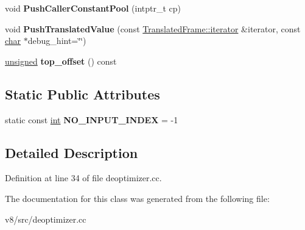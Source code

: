 \begin{DoxyCompactItemize}
void {\bfseries Push\+Caller\+Constant\+Pool} (intptr\+\_\+t cp)
\item 
\mbox{\label{classv8_1_1internal_1_1FrameWriter_a865c96cd2bcdae2c41b1c585c9a55212}} 
void {\bfseries Push\+Translated\+Value} (const \mbox{\hyperlink{classv8_1_1internal_1_1TranslatedFrame_1_1iterator}{Translated\+Frame\+::iterator}} \&iterator, const \mbox{\hyperlink{classchar}{char}} $\ast$debug\+\_\+hint=\char`\"{}\char`\"{})
\item 
\mbox{\label{classv8_1_1internal_1_1FrameWriter_a8b310c9ebd751f9c358a52a820067ad6}} 
\mbox{\hyperlink{classunsigned}{unsigned}} {\bfseries top\+\_\+offset} () const
\end{DoxyCompactItemize}
\subsection*{Static Public Attributes}
\begin{DoxyCompactItemize}
\item 
\mbox{\label{classv8_1_1internal_1_1FrameWriter_abdae2515ee9c8225a1ebe582cdff87c2}} 
static const \mbox{\hyperlink{classint}{int}} {\bfseries N\+O\+\_\+\+I\+N\+P\+U\+T\+\_\+\+I\+N\+D\+EX} = -\/1
\end{DoxyCompactItemize}


\subsection{Detailed Description}


Definition at line 34 of file deoptimizer.\+cc.



The documentation for this class was generated from the following file\+:\begin{DoxyCompactItemize}
\item 
v8/src/deoptimizer.\+cc\end{DoxyCompactItemize}
